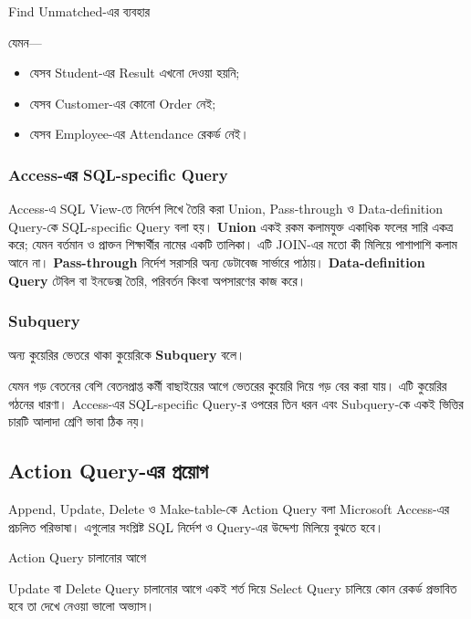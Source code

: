 \begin{keypointbox}{Find Unmatched-এর ব্যবহার}

যেমন—

\begin{itemize}

\item যেসব Student-এর Result এখনো দেওয়া হয়নি;

\item যেসব Customer-এর কোনো Order নেই;

\item যেসব Employee-এর Attendance রেকর্ড নেই।

\end{itemize}

\end{keypointbox}

\subsubsection{Access-এর SQL-specific Query}
Access-এ SQL View-তে নির্দেশ লিখে তৈরি করা Union, Pass-through ও Data-definition Query-কে SQL-specific Query বলা হয়। \textbf{Union} একই রকম কলামযুক্ত একাধিক ফলের সারি একত্র করে; যেমন বর্তমান ও প্রাক্তন শিক্ষার্থীর নামের একটি তালিকা। এটি JOIN-এর মতো কী মিলিয়ে পাশাপাশি কলাম আনে না। \textbf{Pass-through} নির্দেশ সরাসরি অন্য ডেটাবেজ সার্ভারে পাঠায়। \textbf{Data-definition Query} টেবিল বা ইনডেক্স তৈরি, পরিবর্তন কিংবা অপসারণের কাজ করে।

\subsubsection{Subquery}
\begin{definitionbox}{}
অন্য কুয়েরির ভেতরে থাকা কুয়েরিকে \textbf{Subquery} বলে।
\end{definitionbox}
যেমন গড় বেতনের বেশি বেতনপ্রাপ্ত কর্মী বাছাইয়ের আগে ভেতরের কুয়েরি দিয়ে গড় বের করা যায়। এটি কুয়েরির গঠনের ধারণা। Access-এর SQL-specific Query-র ওপরের তিন ধরন এবং Subquery-কে একই ভিত্তির চারটি আলাদা শ্রেণি ভাবা ঠিক নয়।

\subsection{Action Query-এর প্রয়োগ}
Append, Update, Delete ও Make-table-কে Action Query বলা Microsoft Access-এর প্রচলিত পরিভাষা। এগুলোর সংশ্লিষ্ট SQL নির্দেশ ও Query-এর উদ্দেশ্য মিলিয়ে বুঝতে হবে।
\begin{boardbox}{Action Query চালানোর আগে}

Update বা Delete Query চালানোর আগে একই শর্ত দিয়ে Select Query
চালিয়ে কোন রেকর্ড প্রভাবিত হবে তা দেখে নেওয়া ভালো অভ্যাস।

\end{boardbox}


